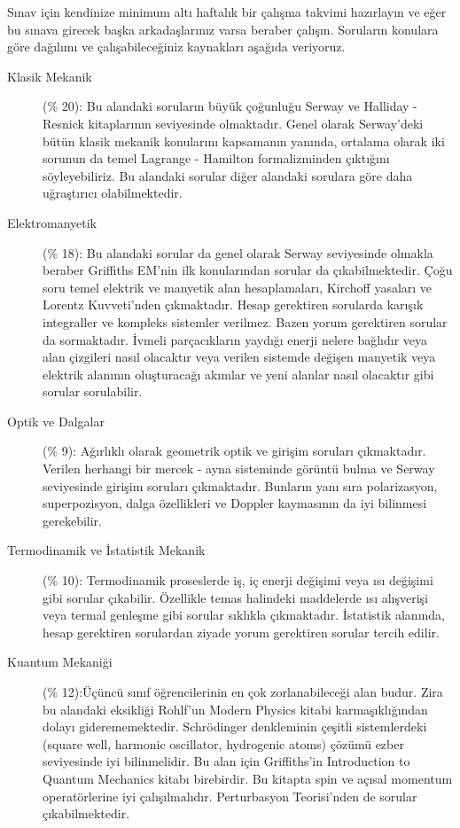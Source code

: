 \documentclass[12pt]{article}
\theoremstyle{break}
\begin{document}
Sınav için kendinize minimum altı haftalık bir çalışma takvimi hazırlayın ve eğer bu sınava girecek başka arkadaşlarınız varsa beraber çalışın. Soruların konulara göre dağılımı ve çalışabileceğiniz kaynakları aşağıda veriyoruz.
\begin{description}
\item[Klasik Mekanik] (\% 20): Bu alandaki soruların büyük çoğunluğu Serway ve Halliday - Resnick kitaplarının seviyesinde olmaktadır. Genel olarak Serway’deki bütün klasik mekanik konularını kapsamanın yanında, ortalama olarak iki sorunun da temel Lagrange - Hamilton formalizminden çıktığını söyleyebiliriz. Bu alandaki sorular diğer alandaki sorulara göre daha uğraştırıcı olabilmektedir. 
\item[Elektromanyetik] (\% 18): Bu alandaki sorular da genel olarak Serway seviyesinde olmakla beraber Griffiths EM’nin ilk konularından sorular da çıkabilmektedir. Çoğu soru temel elektrik ve manyetik alan hesaplamaları, Kirchoff yasaları ve Lorentz Kuvveti’nden çıkmaktadır. Hesap gerektiren sorularda karışık integraller ve kompleks sistemler verilmez. Bazen yorum gerektiren sorular da sormaktadır. İvmeli parçacıkların yaydığı enerji nelere bağlıdır veya alan çizgileri nasıl olacaktır veya verilen sistemde değişen manyetik veya elektrik alanının oluşturacağı akımlar ve yeni alanlar nasıl olacaktır gibi sorular sorulabilir. 
\item[Optik ve Dalgalar] (\% 9): Ağırlıklı olarak geometrik optik ve girişim soruları çıkmaktadır. Verilen herhangi bir mercek - ayna sisteminde görüntü bulma ve Serway seviyesinde girişim soruları çıkmaktadır. Bunların yanı sıra polarizasyon,  superpozisyon, dalga özellikleri ve Doppler kaymasının da iyi bilinmesi gerekebilir.
\item[Termodinamik ve İstatistik Mekanik] (\% 10): Termodinamik proseslerde iş, iç enerji değişimi veya ısı değişimi gibi sorular çıkabilir. Özellikle temas halindeki maddelerde ısı alışverişi veya termal genleşme gibi sorular sıklıkla çıkmaktadır. İstatistik alanında, hesap gerektiren sorulardan ziyade yorum gerektiren sorular tercih edilir.  
\item[Kuantum Mekaniği] (\% 12):Üçüncü sınıf öğrencilerinin en çok zorlanabileceği alan budur. Zira bu alandaki eksikliği Rohlf’un Modern Physics kitabi karmaşıklığından dolayı giderememektedir. Schrödinger denkleminin çeşitli sistemlerdeki (square well, harmonic oscillator, hydrogenic atoms) çözümü ezber seviyesinde iyi bilinmelidir. Bu alan için Griffiths’in Introduction to Quantum Mechanics kitabı birebirdir. Bu kitapta spin ve açısal momentum operatörlerine iyi çalışılmalıdır. Perturbasyon Teorisi’nden de sorular çıkabilmektedir.  

\end{description}
\end{document}
